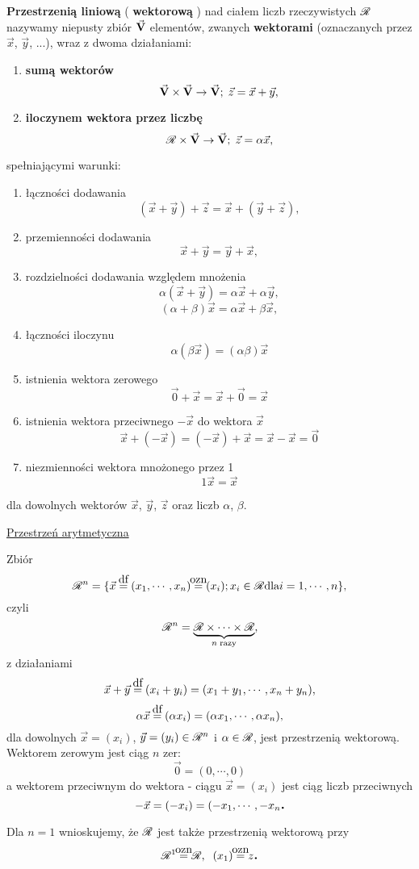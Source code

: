 \begin{mydef}
  \textbf{Przestrzenią liniową} ( \textbf{wektorową} ) nad ciałem liczb rzeczywistych $\mathscr{R}$ nazywamy niepusty zbiór $\vec{\mathbf{V}}$ elementów, zwanych \textbf{wektorami} (oznaczanych przez $\vec{x}$, $\vec{y}$, ...),
  wraz z dwoma działaniami:
  \begin{enumerate}
   \item \textbf{sumą wektorów} \[\vec{\mathbf{V}} \times \vec{\mathbf{V}} \to \vec{\mathbf{V}}; \; \vec{z} = \vec{x} + \vec{y},\]
   \item \textbf{iloczynem wektora przez liczbę} \[\mathscr{R} \times \vec{\mathbf{V}} \to \vec{\mathbf{V}}; \; \vec{z} = \alpha \vec{x},\]
  \end{enumerate}
  spełniającymi warunki:
  \begin{enumerate}
   \item łączności dodawania \[(\vec{x} + \vec{y}) + \vec{z} = \vec{x} + (\vec{y} + \vec{z}),\]
   \item przemienności dodawania \[\vec{x} + \vec{y} = \vec{y} + \vec{x},\]
   \item rozdzielności dodawania względem mnożenia \[\alpha (\vec{x} + \vec{y}) = \alpha \vec{x} + \alpha \vec{y},\] \[(\alpha + \beta) \vec{x} = \alpha \vec{x} + \beta \vec{x},\]
   \item łączności iloczynu \[\alpha(\beta \vec{x}) = (\alpha \beta) \vec{x}\]
   \item istnienia wektora zerowego \[\vec{0} + \vec{x} = \vec{x} + \vec{0} = \vec{x}\]
   \item istnienia wektora przeciwnego $-\vec{x}$ do wektora $\vec{x}$ \[\vec{x} + (-\vec{x}) = (-\vec{x}) + \vec{x} = \vec{x} - \vec{x} = \vec{0}\]
   \item niezmienności wektora mnożonego przez 1 \[1\vec{x} = \vec{x}\]
  \end{enumerate}
  dla dowolnych wektorów $\vec{x}$, $\vec{y}$, $\vec{z}$ oraz liczb $\alpha$, $\beta$.
\end{mydef}

\begin{example}
   \underline{Przestrzeń arytmetyczna}
   
   Zbiór \[\real^n = \{\vec{x} \df (x_1,\cdots,x_n) \ozn (x_i); x_i \in \real \text{dla} i = 1,\cdots,n\},\]
   czyli \[\mathscr{R}^n = \underbrace{\mathscr{R} \times \cdots \times \mathscr{R}}_{n\; \text{razy}},\]
   z działaniami
   \[\vec{x} + \vec{y} \df (x_i+y_i) = (x_1+y_1, \cdots, x_n+y_n),\]
   \[\alpha \vec{x} \df (\alpha x_i) = (\alpha x_1, \cdots, \alpha x_n),\]
   dla dowolnych $\vec{x} = (x_i)$, $\vec{y} = (y_i) \in \mathscr{R}^n$ i $\alpha \in \mathscr{R}$, jest przestrzenią wektorową. Wektorem zerowym jest ciąg $n$ zer:
   \[\vec{0} = (0,\cdots,0)\]
   a wektorem przeciwnym do wektora - ciągu $\vec{x} = (x_i)$ jest ciąg liczb przeciwnych
   \[-\vec{x} = (-x_i) = (-x_1, \cdots, -x_n \mbox{\large\bfseries .}\]
   
   Dla $n=1$ wnioskujemy, że $\mathscr{R}$ jest także przestrzenią wektorową przy \[\real^1 \ozn \real, \;\; (x_1) \ozn z \dend\]
\end{example}

